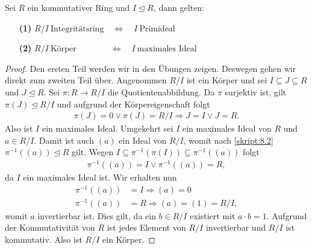 \begin{lemma}\label{skript:8.14}
	Sei $R$ ein kommutativer Ring und $I \unlhd R$, dann gelten:
	\begin{enumerate}
		\item[\textbf{(1)}]
		$R/I \ \text{Integritätsring} \quad \Leftrightarrow \quad  I \ \text{Primideal} $
		
		\item[\textbf{(2)}]
		$R/I \ \text{Körper} \qquad  \qquad \Leftrightarrow \quad  I \ \text{maximales Ideal} $  
	\end{enumerate}
\end{lemma}

\begin{proof}
	Den ersten Teil werden wir in den Übungen zeigen.
	Deswegen gehen wir direkt zum zweiten Teil über.
	Angenommen $R/ I$ ist ein Körper und sei $I \subseteq J \subseteq R$ und $J \unlhd R$.
	Sei $\pi : R \to R/I$ die Quotientenabbildung.
	Da $\pi$ surjektiv ist, gilt $\pi(J) \unlhd R/I $ und aufgrund der Körpereigenschaft
	folgt
	\begin{align*}
	\pi(J) = 0 \vee \pi(J) = R/I
	\Rightarrow
	J = I \vee J = R.
	\end{align*}
	Also ist $I$ ein maximales Ideal.
	Umgekehrt sei $I$ ein maximales Ideal von $R$ und $a \in R/I$.
	Damit ist auch $(a)$ ein Ideal von $R/I$, womit nach \ref{skript:8.2} $\pi^{-1}((a)) \unlhd R $ gilt.
	Wegen $I \subseteq \pi^{-1}(\pi(I)) \subseteq \pi^{-1}((a))$ folgt 
	\begin{align*}
	\pi^{-1}((a)) = I \vee \pi^{-1}((a)) = R,
	\end{align*}
	da $I$ ein maximales Ideal ist. 
	Wir erhalten nun
	\begin{align*}
	\pi^{-1}((a)) &= I \Rightarrow (a) = 0\\
	\pi^{-1}((a)) &= R \Rightarrow (a) = (1) = R/I,
	\end{align*}
	womit $a$ invertierbar ist.
	Dies gilt, da ein $b \in R/I$ existiert mit $a \cdot b = 1$.
	Aufgrund der Kommutativität von $R$ ist jedes Element von $R/I$ invertierbar und $R/I$ ist kommutativ.
	Also ist $R/I$ ein Körper.
\end{proof}

